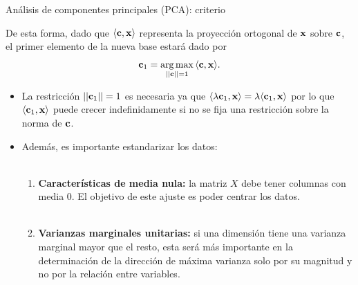 \documentclass[9pt, handout]{beamer}
\begin{document}
\begin{frame}{Análisis de componentes principales (PCA): criterio}

De esta forma, dado que $\langle\mathbf{c},\mathbf{x}\rangle$ representa la proyección ortogonal de $\mathbf{x}$ sobre $\mathbf{c}$, el primer elemento de la nueva base estará dado por 
\begin{equation*}
	\mathbf{c}_1 = \operatorname*{arg\,max}_{||\mathbf{c}||=1} {\langle\mathbf{c},\mathbf{x}\rangle}. \label{eq:PCA_max}
\end{equation*} \pause

\begin{itemize}
	\item La restricción $||\mathbf{c}_1||=1$ es necesaria ya que $\langle\lambda\mathbf{c}_1,\mathbf{x}\rangle = \lambda\langle\mathbf{c}_1,\mathbf{x}\rangle$ por lo que $\langle\mathbf{c}_1,\mathbf{x}\rangle$ puede crecer indefinidamente si no se fija una restricción sobre la norma de $\mathbf{c}$. \pause
	\item Además, es importante estandarizar los datos:\\~\ \pause

	\begin{enumerate}
	\item \textbf{Características de media nula:} la matriz $X$ debe tener columnas con media $0$. El objetivo de este ajuste es poder centrar los datos.\\~\ \pause
	\item \textbf{Varianzas marginales unitarias:} si una dimensión tiene una varianza marginal mayor que el resto, esta será más importante en la determinación de la dirección de máxima varianza solo por su magnitud y no por la relación entre variables.
	\end{enumerate}
\end{itemize}

	
\end{frame}
\end{document}
